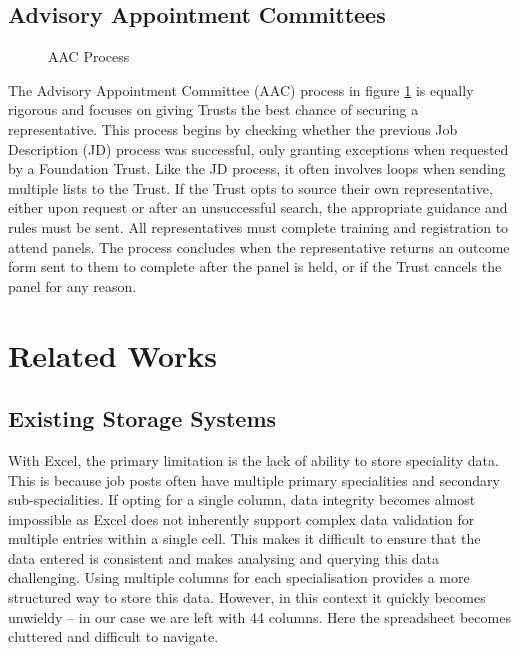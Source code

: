 \subsection{Advisory Appointment Committees}
\begin{figure}[h]
\centering
{}
\vspace{-20pt}
\caption{AAC Process}
\label{fig:aac}
\end{figure}
\vspace{-5pt}
The Advisory Appointment Committee (AAC) process in figure \ref{fig:aac} is equally rigorous and focuses on giving Trusts the best chance of securing a representative. This process begins by checking whether the previous Job Description (JD) process was successful, only granting exceptions when requested by a Foundation Trust. Like the JD process, it often involves loops when sending multiple lists to the Trust. If the Trust opts to source their own representative, either upon request or after an unsuccessful search, the appropriate guidance and rules must be sent. All representatives must complete training and registration to attend panels. The process concludes when the representative returns an outcome form sent to them to complete after the panel is held, or if the Trust cancels the panel for any reason.

\section{Related Works}
\subsection{Existing Storage Systems}
With Excel, the primary limitation is the lack of ability to store speciality data. This is because job posts often have multiple primary specialities and secondary sub-specialities. If opting for a single column, data integrity becomes almost impossible as Excel does not inherently support complex data validation for multiple entries within a single cell. This makes it difficult to ensure that the data entered is consistent and makes analysing and querying this data challenging. Using multiple columns for each specialisation provides a more structured way to store this data. However, in this context it quickly becomes unwieldy – in our case we are left with 44 columns. Here the spreadsheet becomes cluttered and difficult to navigate.

